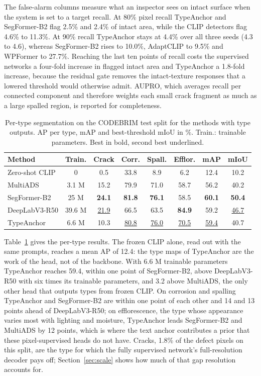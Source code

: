 \documentclass[conference]{IEEEtran}
\newcommand{\best}[1]{\textbf{#1}}
\newcommand{\second}[1]{\underline{#1}}
\newcommand{\ours}{TypeAnchor}
\begin{document}
The false-alarm columns measure what an inspector sees on intact surface when the system is set to a target recall. At 80\% pixel recall \ours{} and SegFormer-B2 flag 2.5\% and 2.4\% of intact area, while the CLIP detectors flag 4.6\% to 11.3\%. At 90\% recall \ours{} stays at 4.4\% over all three seeds (4.3 to 4.6), whereas SegFormer-B2 rises to 10.0\%, AdaptCLIP to 9.5\% and WPFormer to 27.7\%. Reaching the last ten points of recall costs the supervised networks a four-fold increase in flagged intact area and \ours{} a 1.8-fold increase, because the residual gate removes the intact-texture responses that a lowered threshold would otherwise admit. AUPRO, which averages recall per connected component and therefore weights each small crack fragment as much as a large spalled region, is reported for completeness.

\begin{table}[t]
\centering
\caption{Per-type segmentation on the CODEBRIM test split for the methods with type outputs. AP per type, mAP and best-threshold mIoU in \%. Train.: trainable parameters. Best in bold, second best underlined.}
\label{tab:pertype}
\small
\setlength{\tabcolsep}{2.3pt}
\begin{tabular}{lccccccc}
\toprule
Method & Train. & Crack & Corr. & Spall. & Efflor. & mAP & mIoU \\
\midrule
Zero-shot CLIP & 0 & 0.5 & 33.8 & 8.9 & 6.2 & 12.4 & 10.2 \\
MultiADS & 3.1 M & 15.2 & 79.9 & 71.0 & 58.7 & 56.2 & 40.2 \\
SegFormer-B2 & 25 M & \best{24.1} & \best{81.8} & \best{76.1} & 58.5 & \best{60.1} & \best{50.4} \\
DeepLabV3-R50 & 39.6 M & \second{21.9} & 66.5 & 63.5 & \best{84.9} & 59.2 & \second{46.7} \\
\ours{} & 6.6 M & 10.3 & \second{80.8} & \second{76.0} & \second{70.5} & \second{59.4} & 40.7 \\
\bottomrule
\end{tabular}
\end{table}

Table~\ref{tab:pertype} gives the per-type results. The frozen CLIP alone, read out with the same prompts, reaches a mean AP of 12.4: the type maps of \ours{} are the work of the head, not of the backbone. With 6.6 M trainable parameters \ours{} reaches 59.4, within one point of SegFormer-B2, above DeepLabV3-R50 with six times its trainable parameters, and 3.2 above MultiADS, the only other head that outputs types from frozen CLIP. On corrosion and spalling \ours{} and SegFormer-B2 are within one point of each other and 14 and 13 points ahead of DeepLabV3-R50; on efflorescence, the type whose appearance varies most with lighting and moisture, \ours{} leads SegFormer-B2 and MultiADS by 12 points, which is where the text anchor contributes a prior that these pixel-supervised heads do not have. Cracks, 1.8\% of the defect pixels on this split, are the type for which the fully supervised network's full-resolution decoder pays off; Section~\ref{sec:scale} shows how much of that gap resolution accounts for.
\end{document}
